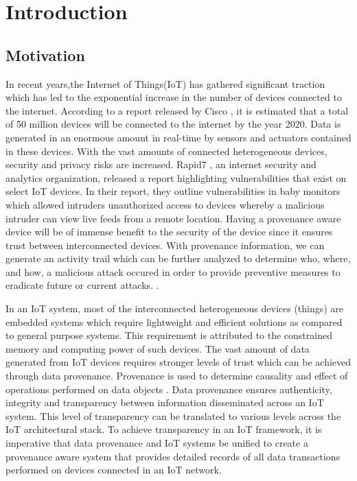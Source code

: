 \chapter{Introduction}\label{chapter:introduction}

\section{Motivation}
In recent years,the Internet of Things(IoT) has gathered significant traction which has led to the exponential increase in the number of devices connected to the internet. According to a report released by Cisco \cite{dave}, it is estimated that a total of 50 million devices will be
connected to the internet by the year 2020. Data is generated in an enormous amount in real-time by sensors and actuators contained in these devices. With the vast amounts of connected heterogeneous devices,
security and privacy risks are increased. Rapid7 \cite{rapid7}, an  internet security and analytics organization, released a report highlighting vulnerabilities that exist on select IoT devices. In their report, they outline  vulnerabilities in
baby monitors which allowed intruders unauthorized access to devices
whereby a malicious intruder can view live feeds from a remote location. Having a provenance aware device will be of immense benefit to the security of the device since it ensures trust between interconnected devices. With provenance information, we can generate an activity trail which can be further analyzed to determine who, where, and how, a malicious attack occured in order to provide preventive measures to eradicate future or current attacks. \cite{cheney_provenance_2009}. 
\par In an IoT system, most of the interconnected heterogeneous devices (things) are embedded systems which
require lightweight and efficient solutions as compared to general purpose
systems. This requirement is attributed to the constrained memory and computing power of such
devices. The vast amount of data generated from IoT
devices requires stronger levels of trust which can be achieved through data
provenance. Provenance is used to determine causality and effect of 
operations performed on data objects \cite{glavic_case_2011}. Data provenance ensures
authenticity, integrity and transparency between information disseminated across an
IoT system. This level of transparency can be translated to various levels across the IoT architectural stack. To achieve transparency in an IoT framework, it is imperative that data provenance and IoT systems be unified to create a provenance aware system that provides detailed records of all data
transactions performed on devices connected in an IoT network. 


